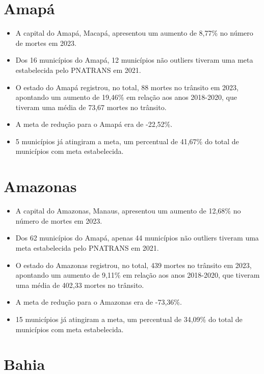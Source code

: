 \documentclass[
  letterpaper,
  DIV=11,
  numbers=noendperiod]{scrreprt}
\begin{document}
\section{Amapá}\label{amapuxe1}

\begin{itemize}
\item
  A capital do Amapá, Macapá, apresentou um aumento de 8,77\% no número
  de mortes em 2023.
\item
  Dos 16 municípios do Amapá, 12 municípios não outliers tiveram uma
  meta estabelecida pelo PNATRANS em 2021.
\item
  O estado do Amapá registrou, no total, 88 mortes no trânsito em 2023,
  apontando um aumento de 19,46\% em relação aos anos 2018-2020, que
  tiveram uma média de 73,67 mortes no trânsito.
\item
  A meta de redução para o Amapá era de -22,52\%.
\item
  5 municípios já atingiram a meta, um percentual de 41,67\% do total de
  municípios com meta estabelecida.
\end{itemize}

\section{Amazonas}\label{amazonas}

\begin{itemize}
\item
  A capital do Amazonas, Manaus, apresentou um aumento de 12,68\% no
  número de mortes em 2023.
\item
  Dos 62 municípios do Amapá, apenas 44 municípios não outliers tiveram
  uma meta estabelecida pelo PNATRANS em 2021.
\item
  O estado do Amazonas registrou, no total, 439 mortes no trânsito em
  2023, apontando um aumento de 9,11\% em relação aos anos 2018-2020,
  que tiveram uma média de 402,33 mortes no trânsito.
\item
  A meta de redução para o Amazonas era de -73,36\%.
\item
  15 municípios já atingiram a meta, um percentual de 34,09\% do total
  de municípios com meta estabelecida.
\end{itemize}

\section{Bahia}\label{bahia}
\end{document}
